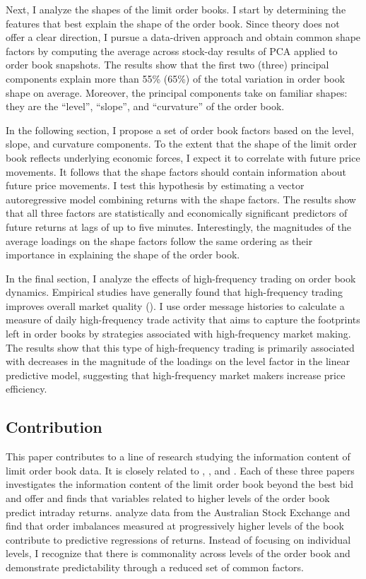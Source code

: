 		Next, I analyze the shapes of the limit order books. I start by determining the features that best explain the shape of the order book. Since theory does not offer a clear direction, I pursue a data-driven approach and obtain common shape factors by computing the average across stock-day results of PCA applied to order book snapshots. The results show that the first two (three) principal components explain more than 55\% (65\%) of the total variation in order book shape on average. Moreover, the principal components take on familiar shapes: they are the ``level'', ``slope'', and ``curvature'' of the order book.

		In the following section, I propose a set of order book factors based on the level, slope, and curvature components. To the extent that the shape of the limit order book reflects underlying economic forces, I expect it to correlate with future price movements. It follows that the shape factors should contain information about future price movements. I test this hypothesis by estimating a vector autoregressive model combining returns with the shape factors. The results show that all three factors are statistically and economically significant predictors of future returns at lags of up to five minutes. Interestingly, the magnitudes of the average loadings on the shape factors follow the same ordering as their importance in explaining the shape of the order book.

		In the final section, I analyze the effects of high-frequency trading on order book dynamics. Empirical studies have generally found that high-frequency trading improves overall market quality (\citet{Boehmer2014,Hendershott2011,Hagstromer2013,Hasbrouck2013}). I use order message histories to calculate a measure of daily high-frequency trade activity that aims to capture the footprints left in order books by strategies associated with high-frequency market making. The results show that this type of high-frequency trading is primarily associated with decreases in the magnitude of the loadings on the level factor in the linear predictive model, suggesting that high-frequency market makers increase price efficiency.

	\subsection{Contribution}
		This paper contributes to a line of research studying the information content of limit order book data. It is closely related to \citet{Cao2009}, \citet{Yuferova2015}, and \citet{Beltran-Lopez2009}. Each of these three papers investigates the information content of the limit order book beyond the best bid and offer and finds that variables related to higher levels of the order book predict intraday returns. \citet{Cao2009} analyze data from the Australian Stock Exchange and find that order imbalances measured at progressively higher levels of the book contribute to predictive regressions of returns. Instead of focusing on individual levels, I recognize that there is commonality across levels of the order book and demonstrate predictability through a reduced set of common factors.

